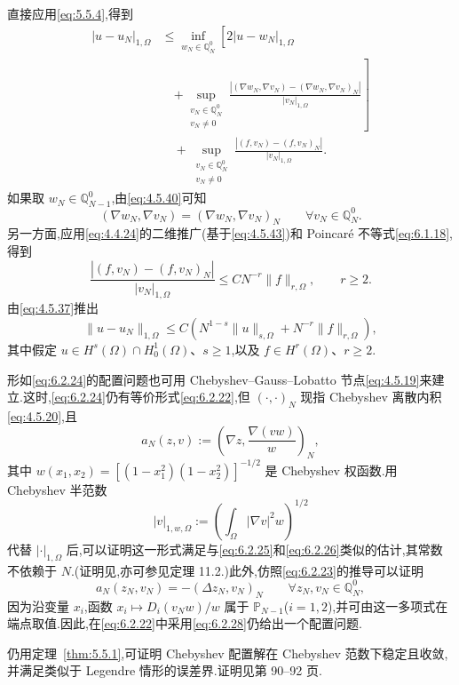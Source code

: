 直接应用\eqref{eq:5.5.4},得到
\[
  \begin{aligned}
    |u-u_N|_{1,\Omega}
    &\le\inf_{w_N\in\mathbb Q_N^0}\left[2|u-w_N|_{1,\Omega}\right.\\
    &\quad\left.+\sup_{\substack{v_N\in\mathbb Q_N^0\\v_N\ne0}}
     \frac{|(\nabla w_N,\nabla v_N)-(\nabla w_N,\nabla v_N)_N|}{|v_N|_{1,\Omega}}\right]\\
    &\quad+\sup_{\substack{v_N\in\mathbb Q_N^0\\v_N\ne0}}
     \frac{|(f,v_N)-(f,v_N)_N|}{|v_N|_{1,\Omega}}.
  \end{aligned}
\]
如果取 \(w_N\in\mathbb Q_{N-1}^0\),由\eqref{eq:4.5.40}可知
\[
  (\nabla w_N,\nabla v_N)=(\nabla w_N,\nabla v_N)_N
   \qquad\forall v_N\in\mathbb Q_N^0.
\]
另一方面,应用\eqref{eq:4.4.24}的二维推广(基于\eqref{eq:4.5.43})和 Poincaré 不等式\eqref{eq:6.1.18},得到
\[
  \frac{|(f,v_N)-(f,v_N)_N|}{|v_N|_{1,\Omega}}
  \le CN^{-r}\|f\|_{r,\Omega},\qquad r\ge2.
\]
由\eqref{eq:4.5.37}推出
\[
  \|u-u_N\|_{1,\Omega}\le C(N^{1-s}\|u\|_{s,\Omega}+N^{-r}\|f\|_{r,\Omega}),
\]
其中假定 \(u\in H^s(\Omega)\cap H_0^1(\Omega)\)、\(s\ge1\),以及 \(f\in H^r(\Omega)\)、\(r\ge2\).

形如\eqref{eq:6.2.24}的配置问题也可用 Chebyshev--Gauss--Lobatto 节点\eqref{eq:4.5.19}来建立.这时,\eqref{eq:6.2.24}仍有等价形式\eqref{eq:6.2.22},但 \((\cdot,\cdot)_N\) 现指 Chebyshev 离散内积\eqref{eq:4.5.20},且
\begin{equation}\label{eq:6.2.28}
  a_N(z,v):=\left(\nabla z,\frac{\nabla(vw)}w\right)_N,
\end{equation}
其中 \(w(x_1,x_2)=[(1-x_1^2)(1-x_2^2)]^{-1/2}\) 是 Chebyshev 权函数.用 Chebyshev 半范数
\[
  |v|_{1,w,\Omega}:=\left(\int_\Omega|\nabla v|^2w\right)^{1/2}
\]
代替 \(|\cdot|_{1,\Omega}\) 后,可以证明这一形式满足与\eqref{eq:6.2.25}和\eqref{eq:6.2.26}类似的估计,其常数不依赖于 \(N\).(证明见,亦可参见定理 11.2.)此外,仿照\eqref{eq:6.2.23}的推导可以证明
\[
  a_N(z_N,v_N)=-(\Delta z_N,v_N)_N\qquad\forall z_N,v_N\in\mathbb Q_N^0,
\]
因为沿变量 \(x_i\),函数 \(x_i\mapsto D_i(v_Nw)/w\) 属于 \(\mathbb P_{N-1}\)(\(i=1,2\)),并可由这一多项式在端点取值.因此,在\eqref{eq:6.2.22}中采用\eqref{eq:6.2.28}仍给出一个配置问题.

仍用定理~\ref{thm:5.5.1},可证明 Chebyshev 配置解在 Chebyshev 范数下稳定且收敛,并满足类似于 Legendre 情形的误差界.证明见第 90–92 页.

